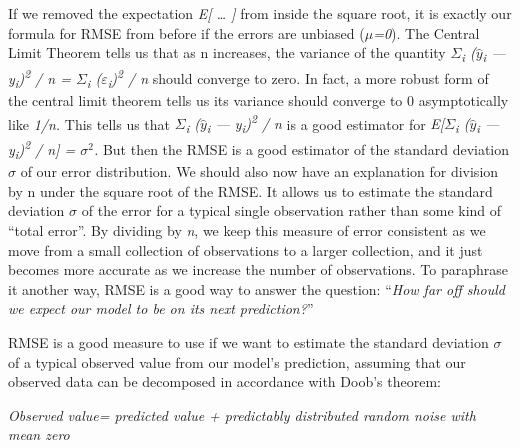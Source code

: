 \documentclass[12pt,a4paper]{report}
\numberwithin{equation}{section}
\begin{document}
If we removed the expectation \emph{E{[} \ldots{} {]}} from inside the
square root, it is exactly our formula for RMSE from before if the
errors are unbiased (\emph{$\mu$=0}). The Central Limit Theorem tells us
that as n increases, the variance of the quantity \emph{$\Sigma$\textsubscript{i} ($\hat{y}$\textsubscript{i} --- y\textsubscript{i})\textsuperscript{2}
/ n = $\Sigma$\textsubscript{i} ($\varepsilon$\textsubscript{i})\textsuperscript{2} / n} should converge to zero. In fact, a more robust form
of the central limit theorem tells us its variance should converge to 0
asymptotically like \emph{1/n.} This tells us that \emph{$\Sigma$\textsubscript{i} ($\hat{y}$\textsubscript{i} --- y\textsubscript{i})\textsuperscript{2}
/ n} is a good estimator for \emph{E{[}$\Sigma$\textsubscript{i} ($\hat{y}$\textsubscript{i} --- y\textsubscript{i})\textsuperscript{2} / n{]} = $\sigma^2$.} But
then the RMSE is a good estimator of the standard deviation \emph{$\sigma$} of
our error distribution. We should also now have an explanation for
division by n under the square root of the RMSE. It allows us to
estimate the standard deviation \emph{$\sigma$} of the error for a typical
single observation rather than some kind of ``total error''. By dividing
by \emph{n}, we keep this measure of error consistent as we move from a
small collection of observations to a larger collection, and it just
becomes more accurate as we increase the number of observations. To
paraphrase it another way, RMSE is a good way to answer the question:
``\emph{How far off should we expect our model to be on its next
prediction?}''

RMSE is a good measure to use if we want to estimate the standard
deviation $\sigma$ of a typical observed value from our model's prediction,
assuming that our observed data can be decomposed in accordance with
Doob's theorem:

\emph{Observed value= predicted value + predictably distributed random
noise with mean zero}
\end{document}
